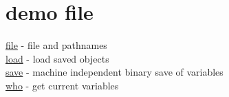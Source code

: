 \chapter*{demo file}

\hyperlink{file}{file} - file and pathnames\\
\hyperlink{load}{load} - load saved objects\\
\hyperlink{save}{save} - machine independent binary save of variables\\
\hyperlink{who}{who} - get current variables\\

 
 
 
 
